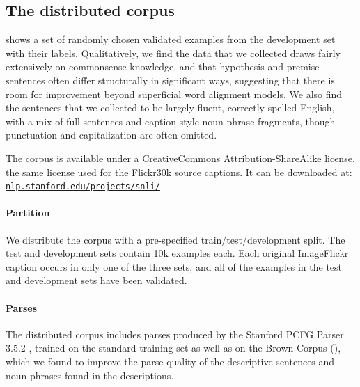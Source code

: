 \subsection{The distributed corpus}

 shows a set of randomly chosen validated examples from the development set with their labels. Qualitatively, we find the data that we collected draws fairly extensively on commonsense knowledge, and that hypothesis and premise sentences often differ structurally in significant ways, suggesting that there is room for improvement beyond superficial word alignment models. We also find the sentences that we collected to be largely fluent, correctly spelled English, with a mix of full sentences and caption-style noun phrase fragments, though punctuation and capitalization are often omitted.

The corpus is available under a CreativeCommons
Attribution-ShareAlike license, the same license used for the Flickr30k source captions. It can be downloaded at:\\\href{http://nlp.stanford.edu/projects/snli/}{\texttt{nlp.stanford.edu/projects/snli/}}

\paragraph{Partition} 

We distribute the corpus with a pre-specified train/test/development split. The test and development sets contain 10k examples each. Each original ImageFlickr caption occurs in only one of the three sets, and all of the examples in the test and development sets have been validated.

\paragraph{Parses}

The distributed corpus includes parses produced by the Stanford PCFG Parser 3.5.2 \cite{klein2003accurate}, trained on the standard training set as well as on the Brown Corpus (\citealt{francis1979brown}), which we found to improve the parse quality of the descriptive sentences and noun phrases found in the descriptions. 


